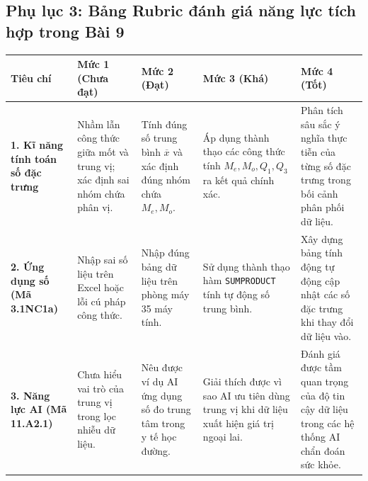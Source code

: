 \documentclass[12pt, a4paper]{article}
\begin{document}
\subsection*{Phụ lục 3: Bảng Rubric đánh giá năng lực tích hợp trong Bài 9}

\begin{center}
\begin{tabularx}{\linewidth}{|p{3.2cm}|X|X|X|X|}
\hline
\textbf{Tiêu chí} & \textbf{Mức 1 (Chưa đạt)} & \textbf{Mức 2 (Đạt)} & \textbf{Mức 3 (Khá)} & \textbf{Mức 4 (Tốt)} \\
\hline
\textbf{1. Kĩ năng tính toán số đặc trưng} & Nhầm lẫn công thức giữa mốt và trung vị; xác định sai nhóm chứa phân vị. & Tính đúng số trung bình $\overline{x}$ và xác định đúng nhóm chứa $M_e, M_o$. & Áp dụng thành thạo các công thức tính $M_e, M_o, Q_1, Q_3$ ra kết quả chính xác. & Phân tích sâu sắc ý nghĩa thực tiễn của từng số đặc trưng trong bối cảnh phân phối dữ liệu. \\
\hline
\textbf{2. Ứng dụng số (Mã 3.1NC1a)} & Nhập sai số liệu trên Excel hoặc lỗi cú pháp công thức. & Nhập đúng bảng dữ liệu trên phòng máy 35 máy tính. & Sử dụng thành thạo hàm \texttt{SUMPRODUCT} tính tự động số trung bình. & Xây dựng bảng tính động tự động cập nhật các số đặc trưng khi thay đổi dữ liệu vào. \\
\hline
\textbf{3. Năng lực AI (Mã 11.A2.1)} & Chưa hiểu vai trò của trung vị trong lọc nhiễu dữ liệu. & Nêu được ví dụ AI ứng dụng số đo trung tâm trong y tế học đường. & Giải thích được vì sao AI ưu tiên dùng trung vị khi dữ liệu xuất hiện giá trị ngoại lai. & Đánh giá được tầm quan trọng của độ tin cậy dữ liệu trong các hệ thống AI chẩn đoán sức khỏe. \\
\hline
\end{tabularx}
\end{center}
\end{document}
